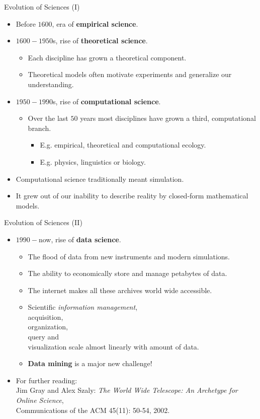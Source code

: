 \begin{frame}{Evolution of Sciences (I)}
	\begin{itemize}
		\item Before $1600$, era of \textbf{empirical science}.
		\item $1600-1950$s, rise of \textbf{theoretical science}.
		\begin{itemize}
			\item Each discipline has grown a theoretical component.
			\item Theoretical models often motivate experiments and generalize 
			our understanding.
		\end{itemize}
		\item $1950-1990$s, rise of \textbf{computational science}.
		\begin{itemize}
			\item Over the last $50$ years most disciplines have grown a third, 
			computational branch.
			\begin{itemize}
				\item E.g. empirical, theoretical and computational ecology.
				\item E.g. physics, linguistics or biology.
			\end{itemize}
		\end{itemize}
		\item Computational science traditionally meant simulation.
		\item It grew out of our inability to describe reality by closed-form 
		mathematical models.
	\end{itemize}
\end{frame}

\begin{frame}{Evolution of Sciences (II)}
	\begin{itemize}
		\item $1990-$now, rise of \textbf{data science}.
		\begin{itemize}
			\item The flood of data from new instruments and modern simulations.
			\item The ability to economically store and manage petabytes of 
			data.
			\item The internet makes all these archives world wide accessible.
			\item Scientific \emph{information management}, \\
			acquisition,\\
			organization, \\
			query and \\
			visualization scale almost linearly with amount of data.
			\item \textbf{Data mining} is a major new challenge!
		\end{itemize}
		\item For further reading:\\
		\small{Jim Gray and Alex Szaly: \emph{The World Wide Telescope: An 
		Archetype for Online Science}, \\ Communications of the ACM 45(11): 
		50-54, 2002.}
	\end{itemize}
\end{frame}


